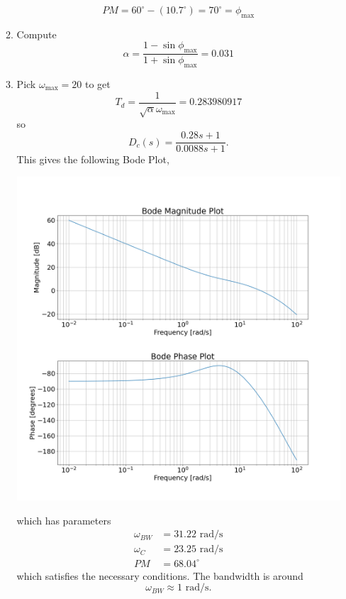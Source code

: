 \documentclass{article}
\begin{document}
\begin{enumerate}[label=\textbf{4.\arabic*}]
\begin{enumerate}[label=(\arabic*)]
    \begin{equation}
        PM = 60^\circ - (10.7^\circ) = 70^\circ = \phi_\text{max}
    \end{equation}
    \item Compute 
    \begin{equation}
        \alpha = \frac{1-\sin\phi_\text{max}}{1+\sin\phi_\text{max}} = 0.031
    \end{equation}
    \item Pick $\omega_\text{max}=20$ to get 
    \begin{equation}
        T_d = \frac{1}{\sqrt{\alpha} \omega_\text{max}} = 0.283980917
    \end{equation}
    so 
    \begin{equation}
        D_c(s) = \frac{0.28s+1}{0.0088s+1}.
    \end{equation}
    This gives the following Bode Plot,
    \begin{center}
        \includegraphics[width=0.7\linewidth]{A4_imgs/q1_bode_final.png}
    \end{center}
    which has parameters 
    \begin{align}
        \omega_{BW} &= 31.22 \text{ rad/s} \\
        \omega_C &= 23.25 \text{ rad/s}\\
        PM &= 68.04^\circ
    \end{align}
    which satisfies the necessary conditions. The bandwidth is around 
    \begin{equation}
        \omega_{BW} \approx 1 \text{ rad/s}.
    \end{equation}
\end{enumerate}

\end{enumerate}
\end{document}
